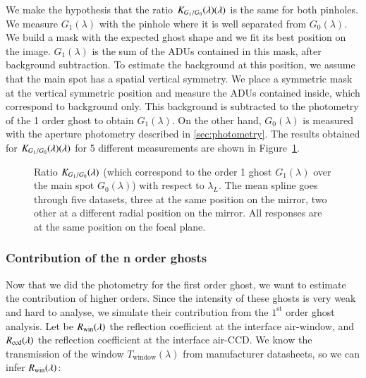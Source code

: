 We make the hypothesis that the ratio $K_{G_1/G_0}(\lambda)(\lambda)$ is the same for both pinholes. We measure $G_1(\lambda)$ with the \spinhole pinhole where it is well separated from $G_0(\lambda)$. We build a mask with the expected ghost shape and we fit its best position on the image. $G_1(\lambda)$ is the sum of the ADUs contained in this mask, after background subtraction. To estimate the background at this position, we assume that the main spot has a spatial vertical symmetry. We place a symmetric mask at the vertical symmetric position and measure the ADUs contained inside, which correspond to background only. This background is subtracted to the photometry of the 1 order ghost to obtain $G_1(\lambda)$. On the other hand, $G_0(\lambda)$ is measured with the aperture photometry described in \ref{sec:photometry}. The results obtained for $K_{G_1/G_0}(\lambda)(\lambda)$ for 5 different measurements are shown in Figure~\ref{fig:ghost_ratio}.


 \begin{figure}[h]
     \centering
     \caption{Ratio $K_{G_1/G_0}(\lambda)$ (which correspond to the order 1 ghost $G_{1}(\lambda)$ over the main spot $G_0(\lambda)$) with respect to $\lambda_L$. The mean spline goes through five datasets, three at the same position on the mirror, two other at a different radial position on the mirror. All responses are at the same position on the focal plane.}
     \label{fig:ghost_ratio}
 \end{figure}
 
 \subsubsection{Contribution of the n order ghosts}

Now that we did the photometry for the first order ghost, we want to estimate the contribution of higher orders. Since the intensity of these ghosts is very weak and hard to analyse, we simulate their contribution from the $1^{\mathrm{st}}$ order ghost analysis. Let be $R_{\mathrm{win}}(\lambda)$ the reflection coefficient at the interface air-window, and $R_{\mathrm{ccd}}(\lambda)$ the reflection coefficient at the interface air-CCD. We know the transmission of the window $T_\mathrm{window}(\lambda)$ from manufacturer datasheets, so we can infer $R_{\mathrm{win}}(\lambda)$:
 
